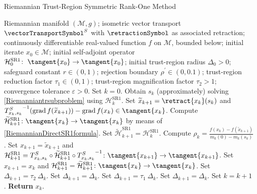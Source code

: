 \begin{algorithm}[H]
    \caption{Riemannian Trust-Region Symmetric Rank-One Method}\label{RTR-SR1Method}
    \begin{algorithmic}[1]
        \State Riemannian manifold $(\mathcal{M}, g)$; isometric vector transport $\vectorTransportSymbol^S$ with $\retractionSymbol$ as associated retraction; continuously differentiable real-valued function $f$ on $\mathcal{M}$, bounded below; initial iterate $x_0 \in \mathcal{M}$; initial self-adjoint operator $\mathcal{H}^\mathrm{SR1}_0 \colon \; \tangent{x_0} \to \tangent{x_0}$; initial trust-region radius $\Delta_0 > 0$; safeguard constant $r \in (0,1)$; rejection boundary $\rho^{\prime} \in (0, 0.1)$; trust-region reduction factor $\tau_1 \in (0,1)$; trust-region magnification factor $\tau_2 > 1$; convergence tolerance $\varepsilon > 0$. Set $k = 0$.
            \State Obtain $s_k$ (approximately) solving \cref{Riemanniantrsubproblem} using $\mathcal{H}^\mathrm{SR1}_k$.
            \State Set $\widetilde{x}_{k+1} = \retract{x_k}(s_k)$ and ${T^{S}_{x_k, s_k}}^{-1} ( \operatorname{grad}f(\widetilde{x}_{k+1}) ) - \operatorname{grad}f(x_k) \in \tangent{x_k}$.
                \State Compute $\widetilde{\mathcal{H}}^\mathrm{SR1}_{k+1} \colon \tangent{x_{k}} \to \tangent{x_{k}}$ by means of \cref{RiemannianDirectSR1formula}.
			\Else 
				\State Set $\widetilde{\mathcal{H}}^\mathrm{SR1}_{k+1} = \mathcal{H}^\mathrm{SR1}_k$.
            \EndIf 
            \State Compute $\rho_k = \frac{f(x_k) - f(\widetilde{x}_{k+1})}{m_k(0) - m_k(s_k)}$.
                \State Set $x_{k+1} = \widetilde{x}_{k+1}$ and $\mathcal{H}^\mathrm{SR1}_{k+1} = T^{S}_{x_k, s_k} \circ \widetilde{\mathcal{H}}^\mathrm{SR1}_{k+1} \circ  {T^{S}_{x_k, s_k}}^{-1} \colon \tangent{x_{k+1}} \to \tangent{x_{k+1}}$.
			\Else 
				\State Set $x_{k+1} = x_k$ and $\mathcal{H}^\mathrm{SR1}_{k+1} = \widetilde{\mathcal{H}}^\mathrm{SR1}_{k+1} \colon \tangent{x_{k}} \to \tangent{x_{k}}$.
            \EndIf 
                    \State Set $\Delta_{k+1} = \tau_2 \ \Delta_k$.
                \Else 
                    \State Set $\Delta_{k+1} = \Delta_k$.
                \EndIf 
			\Else 
                    \State Set $\Delta_{k+1} = \tau_1 \ \Delta_k$.
                \Else 
                    \State Set $\Delta_{k+1} = \Delta_k$.
                \EndIf 
            \EndIf 
            \State Set $k = k+1$.
        \EndWhile
        \State \textbf{Return} $x_k$.
    \end{algorithmic}
\end{algorithm}

